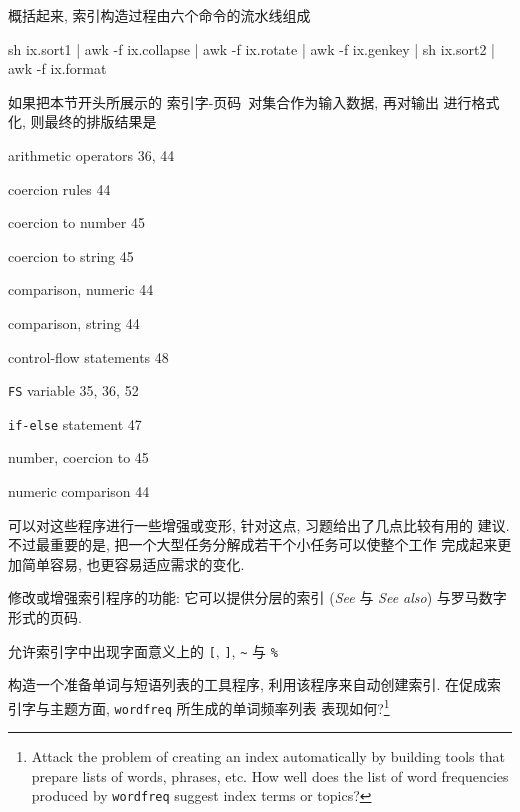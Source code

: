 概括起来, 索引构造过程由六个命令的流水线组成
\begin{awkcode}
    sh ix.sort1 |
    awk -f ix.collapse |
    awk -f ix.rotate |
    awk -f ix.genkey |
    sh ix.sort2 |
    awk -f ix.format
\end{awkcode}
如果把本节开头所展示的 \mbox{索引字}-页码\ 对集合作为输入数据, 再对输出
进行格式化, 则最终的排版结果是
\begin{pattern}
\indent    arithmetic operators 36, 44\par
\indent    coercion rules 44\par
\indent    coercion to number 45\par
\indent    coercion to string 45\par
\indent    comparison, numeric 44\par
\indent    comparison, string 44\par
\indent    control-flow statements 48\par
\indent    \texttt{FS} variable 35, 36, 52\par
\indent    \texttt{if-else} statement 47\par
\indent    number, coercion to 45\par
\indent    numeric comparison 44\par
\end{pattern}

可以对这些程序进行一些增强或变形, 针对这点, 习题给出了几点比较有用的
建议. 不过最重要的是, 把一个大型任务分解成若干个小任务可以使整个工作
完成起来更加简单容易, 也更容易适应需求的变化.

\begin{exercise}
    修改或增强索引程序的功能: 它可以提供分层的索引 (\textit{See} 与
    \textit{See also}) 与罗马数字形式的页码.
\end{exercise}

\begin{exercise}
    \label{exer:literal}
    允许索引字中出现字面意义上的 \texttt{[}, \texttt{]}, \verb'~' 与 
    \verb'%'
\end{exercise}

\begin{exercise}
    构造一个准备单词与短语列表的工具程序, 利用该程序来自动创建索引.
    在促成索引字与主题方面, \texttt{wordfreq} 所生成的单词频率列表
    表现如何?\footnote{Attack the problem of creating an index
        automatically by building tools that prepare lists of words,
        phrases, etc. How well does the list of word frequencies produced
        by \texttt{wordfreq} suggest index terms or topics?}
\end{exercise}

